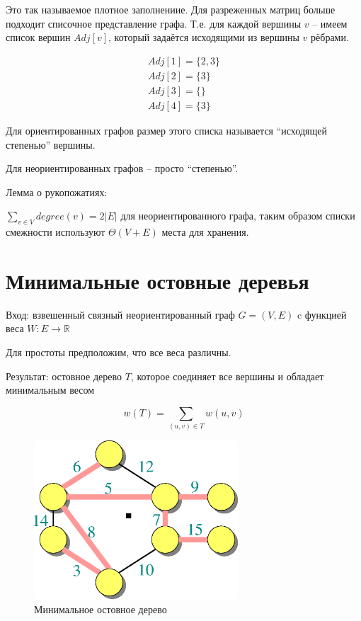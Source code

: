 \documentclass[a4paper,11pt]{article}
\begin{document}
Это так называемое плотное заполнениие. Для разреженных матриц больше подходит
списочное представление графа. Т.е. для каждой вершины $v$ -- имеем список
вершин $Adj[v]$, который задаётся исходящими из вершины $v$ рёбрами.

\begin{gather*}
Adj[1] = \{ 2, 3 \} \\
Adj[2] = \{ 3 \} \\
Adj[3] = \{ \} \\
Adj[4] = \{ 3 \} 
\end{gather*}

Для ориентированных графов размер этого списка называется ``исходящей степенью''
вершины.

Для неориентированных графов -- просто ``степенью''.

Лемма о рукопожатиях:

$\sum_{ v \in V}{degree(v)} = 2|E| $ для неориентированного графа, таким образом
списки смежности используют $\Theta(V + E)$ места для хранения.

\section{Минимальные остовные деревья}
Вход: взвешенный связный неориентированный граф $G = (V, E)$ c функцией веса $W
\colon E \to \mathbb{R}$

Для простоты предположим, что все веса различны.

Результат: остовное дерево $T$, которое соединяет все вершины и обладает минимальным
весом

$$
w(T) = \sum_{(u,v) \in T} w(u, v)
$$

\begin{figure}[ht]
  \centering
  \includegraphics[width=3in]{lecture16/graph-mst.eps}
  \caption{Минимальное остовное дерево}
  \label{fig:mst}
\end{figure}
\end{document}
